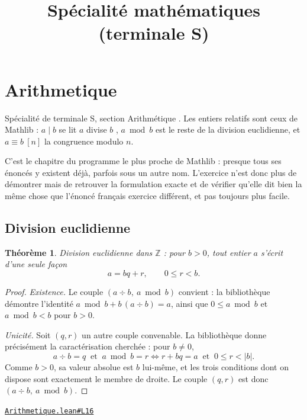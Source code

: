 \documentclass[11pt,a4paper]{article}
\title{Spécialité mathématiques (terminale S)}
\date{}
\theoremstyle{definition}
\theoremstyle{plain}
\newtheorem{theoreme}{Théorème}
\newcommand{\source}[2]{\par\smallskip\noindent\hfill{\footnotesize\href{#1}{\texttt{#2}}}\par\smallskip}
\begin{document}
\maketitle
\sloppy

\section{Arithmetique}

\noindent
Spécialité de terminale S, section \og{} Arithmétique \fg{}. Les entiers relatifs sont
ceux de Mathlib : $a \mid b$ se lit \og{} $a$ divise $b$ \fg{}, $a \bmod b$ est le reste de
la division euclidienne, et $a \equiv b \ [n]$ la congruence modulo $n$.

\medskip\noindent
C'est le chapitre du programme le plus proche de Mathlib : presque tous ses énoncés y
existent déjà, parfois sous un autre nom. L'exercice n'est donc plus de démontrer mais de
retrouver la formulation exacte et de vérifier qu'elle dit bien la même chose que l'énoncé
français \textemdash{} exercice différent, et pas toujours plus facile.

\subsection{Division euclidienne}

\begin{theoreme}
Division euclidienne dans $\mathbb{Z}$ : pour $b > 0$, tout entier $a$ s'écrit d'une seule
façon
\[ a = bq + r , \qquad 0 \le r < b . \]
\end{theoreme}

\begin{proof}
\emph{Existence.} Le couple $(a \div b,\ a \bmod b)$ convient : la bibliothèque démontre
l'identité $a \bmod b + b\,(a \div b) = a$, ainsi que $0 \le a \bmod b$ et
$a \bmod b < b$ pour $b > 0$.

\emph{Unicité.} Soit $(q, r)$ un autre couple convenable. La bibliothèque donne
précisément la caractérisation cherchée : pour $b \ne 0$,
\[ a \div b = q \ \text{ et } \ a \bmod b = r
   \iff r + bq = a \ \text{ et } \ 0 \le r < |b| . \]
Comme $b > 0$, sa valeur absolue est $b$ lui-même, et les trois conditions dont on dispose
sont exactement le membre de droite. Le couple $(q, r)$ est donc $(a \div b,\ a \bmod b)$.
\end{proof}
\source{https://github.com/Commutator-IO/learn-lean/blob/main/cours/02-lycee/10-specialite-mathematiques-terminale-s/Arithmetique.lean\#L16}{Arithmetique.lean\#L16}
\end{document}
